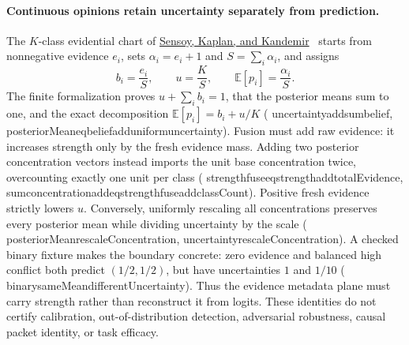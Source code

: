 \documentclass[11pt]{article}
\newcommand{\leanname}[1]{{\scriptsize\ttfamily
  \def\_{\textunderscore\allowbreak}#1}}
\begin{document}
\paragraph{Continuous opinions retain uncertainty separately from prediction.}
The $K$-class evidential chart of
\href{https://arxiv.org/abs/1806.01768}{Sensoy, Kaplan, and
Kandemir}~\cite{sensoy2018edl} starts from nonnegative evidence $e_i$, sets
$\alpha_i=e_i+1$ and $S=\sum_i\alpha_i$, and assigns
\[
 b_i=\frac{e_i}{S},\qquad
 u=\frac{K}{S},\qquad
 \mathbb{E}[p_i]=\frac{\alpha_i}{S}.
\]
The finite formalization proves $u+\sum_i b_i=1$, that the posterior means
sum to one, and the exact decomposition
$\mathbb{E}[p_i]=b_i+u/K$
(\leanname{uncertainty\_add\_sum\_belief},
\leanname{posteriorMean\_eq\_belief\_add\_uniform\_uncertainty}).
Fusion must add raw evidence: it increases strength only by the fresh
evidence mass. Adding two posterior concentration vectors instead imports
the unit base concentration twice, overcounting exactly one unit per class
(\leanname{strength\_fuse\_eq\_strength\_add\_totalEvidence},
\leanname{sum\_concentration\_add\_eq\_strength\_fuse\_add\_classCount}).
Positive fresh evidence strictly lowers $u$. Conversely, uniformly rescaling
all concentrations preserves every posterior mean while dividing uncertainty
by the scale
(\leanname{posteriorMean\_rescaleConcentration},
\leanname{uncertainty\_rescaleConcentration}). A checked binary fixture makes
the boundary concrete: zero evidence and balanced high conflict both predict
$(1/2,1/2)$, but have uncertainties $1$ and $1/10$
(\leanname{binary\_sameMean\_differentUncertainty}). Thus the evidence
metadata plane must carry strength rather than reconstruct it from logits.
These identities do not certify calibration, out-of-distribution detection,
adversarial robustness, causal packet identity, or task efficacy.
\end{document}
